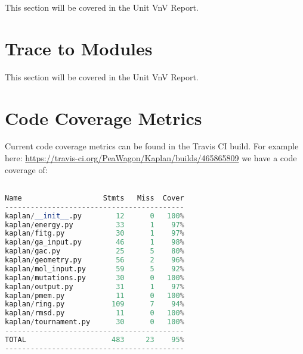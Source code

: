 \documentclass[12pt, titlepage]{article}
\begin{document}
This section will be covered in the Unit VnV Report.

\section{Trace to Modules}		

This section will be covered in the Unit VnV Report.

\section{Code Coverage Metrics}

Current code coverage metrics can be found in the Travis CI build. For example 
here: \url{https://travis-ci.org/PeaWagon/Kaplan/builds/465865809} we have a 
code coverage of:

\begin{lstlisting}[language=python, showstringspaces=false]

Name                   Stmts   Miss  Cover
------------------------------------------
kaplan/__init__.py        12      0   100%
kaplan/energy.py          33      1    97%
kaplan/fitg.py            30      1    97%
kaplan/ga_input.py        46      1    98%
kaplan/gac.py             25      5    80%
kaplan/geometry.py        56      2    96%
kaplan/mol_input.py       59      5    92%
kaplan/mutations.py       30      0   100%
kaplan/output.py          31      1    97%
kaplan/pmem.py            11      0   100%
kaplan/ring.py           109      7    94%
kaplan/rmsd.py            11      0   100%
kaplan/tournament.py      30      0   100%
------------------------------------------
TOTAL                    483     23    95%
------------------------------------------

\end{lstlisting}





\end{document}
